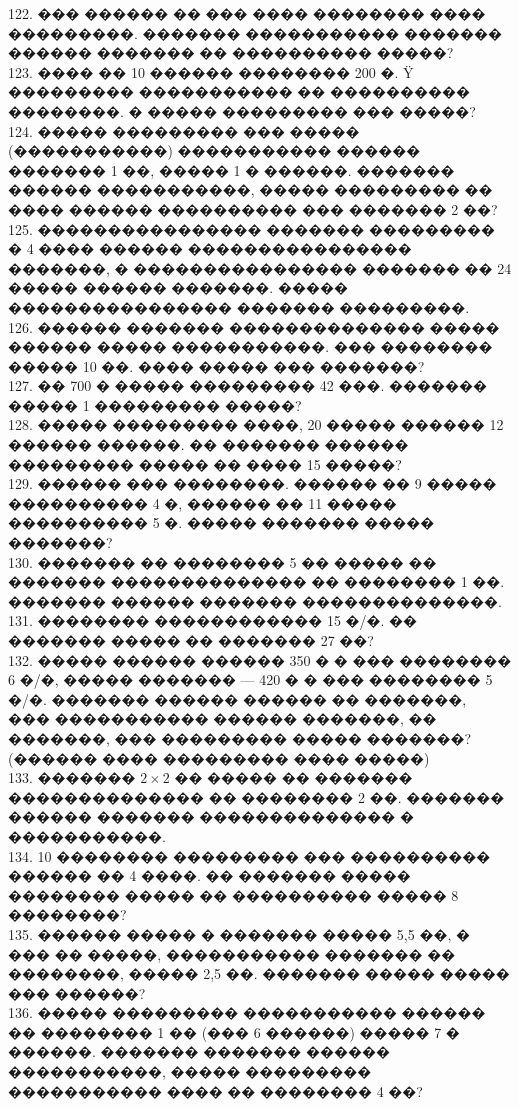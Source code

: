 \documentclass[12pt]{article}
\begin{document}
122. ��� ������ �� ��� ���� �������� ���� ���������. ������� ����������� ������� ������ ������� �� ���������� �����?\\
123. ���� �� 10 ������ �������� 200 �. Ÿ ��������� ����������� �� ���������� ��������. � ����� ��������� ��� �����?\\
124. ����� ��������� ��� ����� (�����������) ����������� ������ ������� 1 ��, ����� 1 � ������. ������� ������ �����������, ����� ��������� �� ���� ������ ���������� ��� ������� 2 ��?\\
125. ���������������� ������� ��������� � 4 ���� ������ ���������������� �������, � ���������������� ������� �� 24 ����� ������ �������. ����� ���������������� ������� ���������.\\
126. ������ ������� �������������� ����� ������ ����� �����������. ��� �������� ����� 10 ��. ���� ����� ��� �������?\\
127. �� 700 � ����� ��������� 42 ���. ������� ����� 1 ��������� �����?\\
128. ����� ��������� ����, 20 ����� ������ 12 ������ ������. �� ������� ������ ��������� ����� �� ���� 15 �����?\\
129. ������ ��� ��������. ������ �� 9 ����� ���������� 4 �, ������ �� 11 ����� ���������� 5 �. ����� ������� ����� �������?\\
130. ������� �� �������� 5 �� ����� �� ������� �������������� �� �������� 1 ��. ������� ������ ������� ��������������.\\
131. �������� ������������ 15 �/�. �� ������� ����� �� ������� 27 ��?\\
132. ����� ������ ������ 350 � � ��� �������� 6 �/�, ����� ������� --- 420 � � ��� �������� 5 �/�. ������� ������ ������ �� �������, ��� ����������� ������ �������, �� �������, ��� ��������� ����� �������? (������ ���� ��������� ���� �����)\\
133. ������� $2\times2$ �� ����� �� ������� �������������� �� �������� 2 ��. ������� ������ ������� �������������� � �����������.\\
134. 10 �������� ��������� ��� ���������� ������ �� 4 ����. �� ������� ����� �������� ����� �� ���������� ����� 8 ��������?\\
135. ������ ����� � ������� ����� 5,5 ��, � ��� �� �����, ����������� ������� �� ��������, ����� 2,5 ��. ������� ����� ����� ��� ������?\\
136. ����� ��������� ����������� ������ �� �������� 1 �� (��� 6 ������) ����� 7 � ������. ������� ������� ������ �����������, ����� ��������� ����������� ���� �� �������� 4 ��?\\
\end{document}
